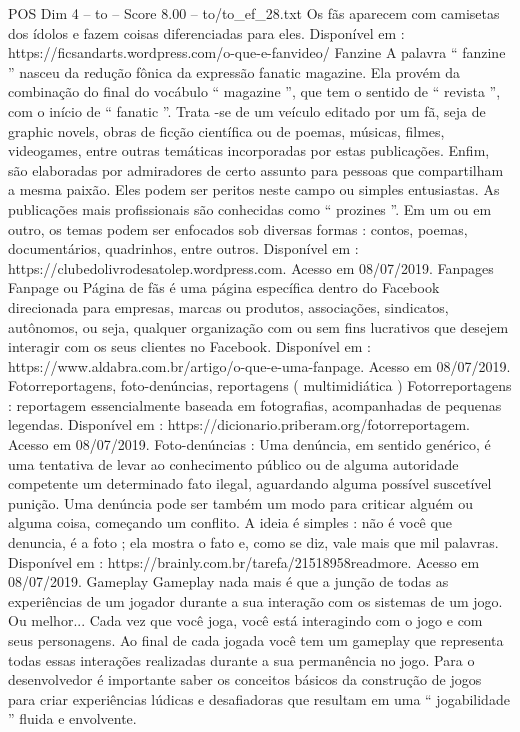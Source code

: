 \begin{textsample}{POS Dim 4 – to – Score 8.00 – to/to\_ef\_28.txt}
Os fãs aparecem com camisetas dos ídolos e fazem coisas diferenciadas para eles.
Disponível em : https://ficsandarts.wordpress.com/o-que-e-fanvideo/ Fanzine A palavra “ fanzine ” nasceu da redução fônica da expressão fanatic magazine.
Ela provém da combinação do final do vocábulo “ magazine ”, que tem o sentido de “ revista ”, com o início de “ fanatic ”.
Trata -se de um veículo editado por um fã, seja de graphic novels, obras de ficção científica ou de poemas, músicas, filmes, videogames, entre outras temáticas incorporadas por estas publicações.
Enfim, são elaboradas por admiradores de certo assunto para pessoas que compartilham a mesma paixão.
Eles podem ser peritos neste campo ou simples entusiastas.
As publicações mais profissionais são conhecidas como “ prozines ”.
Em um ou em outro, os temas podem ser enfocados sob diversas formas : contos, poemas, documentários, quadrinhos, entre outros.
Disponível em : https://clubedolivrodesatolep.wordpress.com.
Acesso em 08/07/2019.
Fanpages Fanpage ou Página de fãs é uma página específica dentro do Facebook direcionada para empresas, marcas ou produtos, associações, sindicatos, autônomos, ou seja, qualquer organização com ou sem fins lucrativos que desejem interagir com os seus clientes no Facebook.
Disponível em : https://www.aldabra.com.br/artigo/o-que-e-uma-fanpage.
Acesso em 08/07/2019.
Fotorreportagens, foto-denúncias, reportagens ( multimidiática ) Fotorreportagens : reportagem essencialmente baseada em fotografias, acompanhadas de pequenas legendas.
Disponível em : https://dicionario.priberam.org/fotorreportagem.
Acesso em 08/07/2019.
Foto-denúncias : Uma denúncia, em sentido genérico, é uma tentativa de levar ao conhecimento público ou de alguma autoridade competente um determinado fato ilegal, aguardando alguma possível suscetível punição.
Uma denúncia pode ser também um modo para criticar alguém ou alguma coisa, começando um conflito.
A ideia é simples : não é você que denuncia, é a foto ; ela mostra o fato e, como se diz, vale mais que mil palavras.
Disponível em : https://brainly.com.br/tarefa/21518958readmore.
Acesso em 08/07/2019.
Gameplay Gameplay nada mais é que a junção de todas as experiências de um jogador durante a sua interação com os sistemas de um jogo.
Ou melhor...
Cada vez que você joga, você está interagindo com o jogo e com seus personagens.
Ao final de cada jogada você tem um gameplay que representa todas essas interações realizadas durante a sua permanência no jogo.
Para o desenvolvedor é importante saber os conceitos básicos da construção de jogos para criar experiências lúdicas e desafiadoras que resultam em uma “ jogabilidade ” fluida e envolvente.

\end{textsample}
